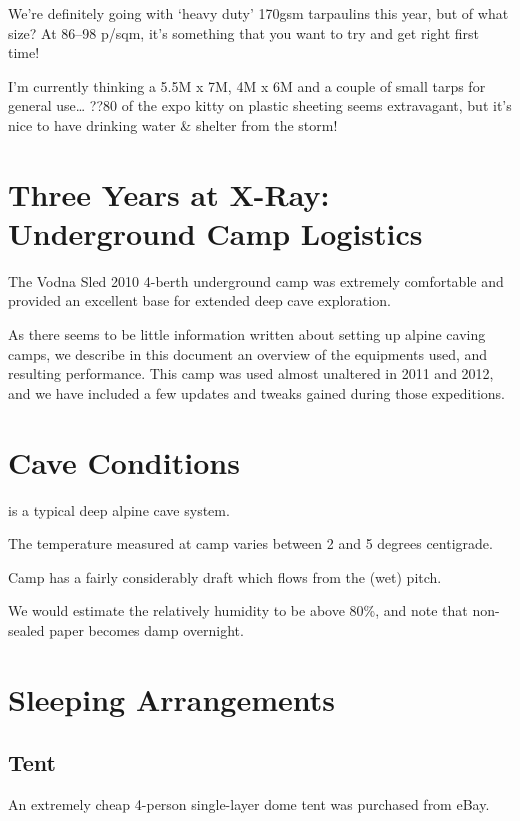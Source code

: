 We’re definitely going with ‘heavy duty’ 170gsm tarpaulins this year,
but of what size? At 86–98 p/sqm, it’s something that you want to try
and get right first time! 

I’m currently thinking a 5.5M x 7M, 4M x 6M and a couple of small
tarps for general use… ??80 of the expo kitty on plastic sheeting
seems extravagant, but it’s nice to have drinking water \& shelter from
the storm!



\newpage

\section{Three Years at X-Ray: Underground Camp
Logistics}

The Vodna Sled 2010 4-berth underground camp was extremely comfortable
and provided an excellent base for extended deep cave exploration.

As there seems to be little information written about setting up alpine
caving camps, we describe in this document an overview of the equipments
used, and resulting performance. This camp was used almost unaltered in
2011 and 2012, and we have included a few updates and tweaks gained
during those expeditions.


\section{Cave Conditions}

 is a typical deep alpine cave system.

The temperature measured at camp varies between 2 and 5 degrees
centigrade.

Camp  has a fairly considerably draft which flows from the (wet)  pitch.

We would estimate the relatively humidity to be above 80\%, and note
that non-sealed paper becomes damp overnight.

\section{Sleeping Arrangements}

\subsection{Tent}

An extremely cheap 4-person single-layer dome tent was purchased from
eBay.

